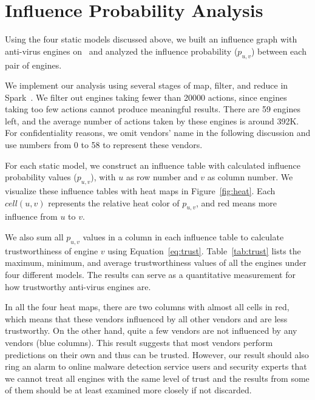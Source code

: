
\vspace{-0.05in}
\section{Influence Probability Analysis}
\label{sec:influenceanalysis}

Using the four static models discussed above, we built an influence graph with anti-virus engines on \vt\ and analyzed 
the influence probability ($p_{u,v}$) between each pair of engines.

We implement our analysis using several stages of map, filter, and reduce in Spark~\cite{spark}. 
We filter out engines taking fewer than 20000 actions,
since engines taking too few actions cannot produce meaningful results.
There are 59 engines left,
and the average number of actions taken by these engines is around 392K.
For confidentiality reasons, we omit vendors' name in the following discussion
and use numbers from 0 to 58 to represent these vendors.


For each static model, 
we construct an influence table with calculated influence probability values ($p_{u,v}$), 
with $u$ as row number and $v$ as column number.
We visualize these influence tables with heat maps in Figure~\ref{fig:heat}. 
Each $cell(u, v)$ represents the relative heat color of $p_{u,v}$, 
and red means more influence from $u$ to $v$. 

We also sum all $p_{u,v}$ values in a column in each influence table 
to calculate trustworthiness of engine $v$ using Equation~\ref{eq:trust}. 
Table~\ref{tab:trust} lists the maximum, minimum, and average trustworthiness values of all the engines under four different models.
The results can serve as a quantitative measurement for how trustworthy anti-virus engines are. 

In all the four heat maps, there are two columns with almost all cells in red,
which means that these vendors influenced by all other vendors and are less trustworthy.
On the other hand, quite a few vendors are not influenced by any vendors (blue columns).
This result suggests that most vendors perform predictions on their own and thus can be trusted. 
However, our result should also ring an alarm to online malware detection service users and security experts that 
we cannot treat all engines with the same level of trust 
and the results from some of them should be at least examined more closely if not discarded.

